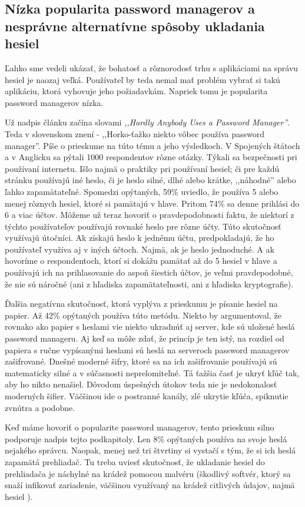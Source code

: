 \subsection{Nízka popularita password managerov a nesprávne alternatívne spôsoby ukladania hesiel}
Ľahko sme vedeli ukázať, že bohatosť a rôznorodosť trhu s aplikáciami na správu hesiel je naozaj veľká. Používateľ by teda nemal mať problém vybrať si takú aplikáciu, ktorá vyhovuje jeho požiadavkám. Napriek tomu je popularita password managerov nízka. 

Už nadpis článku \cite{survey1} začína slovami \textit{,,Hardly Anybody Uses a Password Manager''}. Teda v slovenskom znení - ,,Horko-ťažko niekto vôbec používa password manager''. Píše o prieskume na túto tému a jeho výsledkoch. V Spojených štátoch a v Anglicku sa pýtali 1000 respondentov rôzne otázky. Týkali sa bezpečnosti pri používaní internetu. Išlo najmä o praktiky pri používaní hesiel; či pre každú stránku používajú iné heslo, či je heslo silné, dlhé alebo krátke, ,,náhodné'' alebo ľahko zapamätateľné. Spomedzi opýtaných, 59\% uviedlo, že používa 5 alebo menej rôznych hesiel, ktoré si pamätajú v hlave. Pritom 74\% sa denne prihlási do 6 a viac účtov. Môžeme už teraz hovoriť o pravdepodobnosti faktu, že niektorí z týchto používateľov používajú rovnaké heslo pre rôzne účty. Túto skutočnosť využívajú útočníci. Ak získajú heslo k jednému účtu, predpokladajú, že ho používateľ využíva aj v iných účtoch. Najmä, ak je heslo jednoduché. A ak hovoríme o respondentoch, ktorí si dokážu pamätať až do 5 hesiel v hlave a používajú ich na prihlasovanie do aspoň šiestich účtov, je veľmi pravdepodobné, že nie sú náročné (ani z hľadiska zapamätateľnosti, ani z hľadiska kryptografie).

Ďalšia negatívna skutočnosť, ktorá vyplýva z prieskumu je písanie hesiel na papier. Až 42\% opýtaných používa túto metódu. Niekto by argumentoval, že rovnako ako papier s heslami vie niekto ukradnúť aj server, kde sú uložené heslá password manageru. Aj keď sa môže zdať, že princíp je ten istý, na rozdiel od papiera s ručne vypísanými heslami sú heslá na serveroch password managerov zašifrované. Dnešné moderné šifry, ktoré sa na ich zašifrovanie používajú sú matematicky silné a v súčasnosti neprelomiteľné. Tá ťažšia časť je ukryť kľúč tak, aby ho nikto nenašiel. Dôvodom úspešných útokov teda nie je nedokonalosť moderných šifier. Väčšinou ide o postranné kanály, zlé ukrytie kľúča, spiknutie zvnútra a podobne.

Keď máme hovoriť o popularite password managerov, tento prieskum silno podporuje nadpis tejto podkapitoly. Len 8\% opýtaných používa na svoje heslá nejakého správcu. Naopak, menej než tri štvrtiny si vystačí s tým, že si ich heslá zapamätá prehliadač. Tu treba uviesť skutočnosť, že ukladanie hesiel do prehliadača je náchylné na krádež pomocou malvéru (škodlivý softvér, ktorý sa snaží infikovať zariadenie, väčšinou využívaný na krádež citlivých údajov, najmä hesiel \cite{malware}). 

